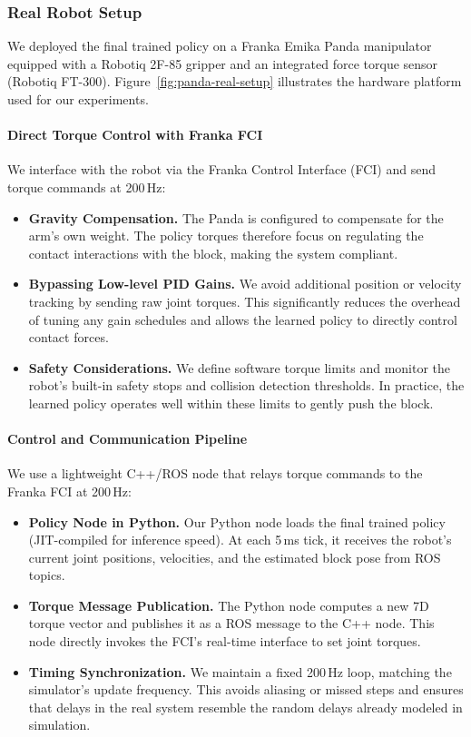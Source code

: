 \subsubsection{Real Robot Setup}
\label{appendix:RealWorldNonprehensileReorientationPolicyPerformance:real-env}

We deployed the final trained policy on a Franka Emika Panda manipulator equipped with a Robotiq 2F-85 gripper and an integrated force torque sensor (Robotiq FT-300). Figure~\ref{fig:panda-real-setup} illustrates the hardware platform used for our experiments.

\paragraph{Direct Torque Control with Franka FCI}  
We interface with the robot via the Franka Control Interface (FCI) and send torque commands at 200\,Hz:
\begin{itemize}[leftmargin=1em]
    \item \textbf{Gravity Compensation.} The Panda is configured to compensate for the arm's own weight. The policy torques therefore focus on regulating the contact interactions with the block, making the system compliant.  
    \item \textbf{Bypassing Low-level PID Gains.} We avoid additional position or velocity tracking by sending raw joint torques. This significantly reduces the overhead of tuning any gain schedules and allows the learned policy to directly control contact forces.  
    \item \textbf{Safety Considerations.} We define software torque limits and monitor the robot's built-in safety stops and collision detection thresholds. In practice, the learned policy operates well within these limits to gently push the block.  
\end{itemize}

\paragraph{Control and Communication Pipeline}  
We use a lightweight C++/ROS node that relays torque commands to the Franka FCI at 200\,Hz:
\begin{itemize}[leftmargin=1em]
    \item \textbf{Policy Node in Python.} Our Python node loads the final trained policy (JIT-compiled for inference speed). At each 5\,ms tick, it receives the robot’s current joint positions, velocities, and the estimated block pose from ROS topics.  
    \item \textbf{Torque Message Publication.} The Python node computes a new 7D torque vector and publishes it as a ROS message to the C++ node. This node directly invokes the FCI’s real-time interface to set joint torques.  
    \item \textbf{Timing Synchronization.} We maintain a fixed 200\,Hz loop, matching the simulator’s update frequency. This avoids aliasing or missed steps and ensures that delays in the real system resemble the random delays already modeled in simulation.  
\end{itemize}

